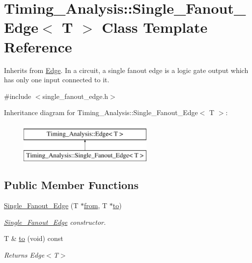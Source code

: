 \hypertarget{classTiming__Analysis_1_1Single__Fanout__Edge}{\section{Timing\-\_\-\-Analysis\-:\-:Single\-\_\-\-Fanout\-\_\-\-Edge$<$ T $>$ Class Template Reference}
\label{classTiming__Analysis_1_1Single__Fanout__Edge}
}


Inherits from \hyperlink{classTiming__Analysis_1_1Edge}{Edge}. In a circuit, a single fanout edge is a logic gate output which has only one input connected to it.  




{\ttfamily \#include $<$single\-\_\-fanout\-\_\-edge.\-h$>$}

Inheritance diagram for Timing\-\_\-\-Analysis\-:\-:Single\-\_\-\-Fanout\-\_\-\-Edge$<$ T $>$\-:\begin{figure}[H]
\begin{center}
\leavevmode
\includegraphics[height=2.000000cm]{classTiming__Analysis_1_1Single__Fanout__Edge}
\end{center}
\end{figure}
\subsection*{Public Member Functions}
\begin{DoxyCompactItemize}
\item 
\hyperlink{classTiming__Analysis_1_1Single__Fanout__Edge_ac588152ff213288a57a744374039790a}{Single\-\_\-\-Fanout\-\_\-\-Edge} (T $\ast$\hyperlink{classTiming__Analysis_1_1Edge_a47020ea89fd9fde438adc814a731a23d}{from}, T $\ast$\hyperlink{classTiming__Analysis_1_1Single__Fanout__Edge_ac01deccce158b6cee6883924e6dcb788}{to})
\begin{DoxyCompactList}\small\item\em \hyperlink{classTiming__Analysis_1_1Single__Fanout__Edge}{Single\-\_\-\-Fanout\-\_\-\-Edge} constructor. \end{DoxyCompactList}\item 
T \& \hyperlink{classTiming__Analysis_1_1Single__Fanout__Edge_ac01deccce158b6cee6883924e6dcb788}{to} (void) const 
\begin{DoxyCompactList}\small\item\em Returns Edge$<$\-T$>$ \end{DoxyCompactList}\end{DoxyCompactItemize}
